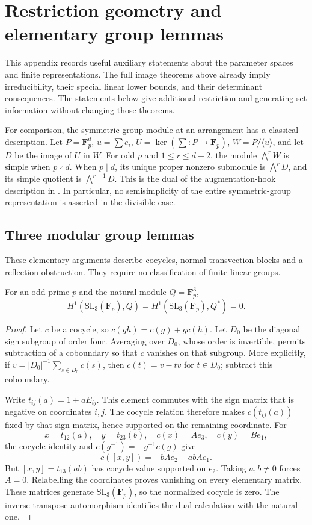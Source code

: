 \appendix
\section{Restriction geometry and elementary group lemmas}\label{app:auxiliaries}
This appendix records useful auxiliary statements about the parameter spaces and finite representations. The full image theorems above already imply irreducibility, their special linear lower bounds, and their determinant consequences. The statements below give additional restriction and generating-set information without changing those theorems.

For comparison, the symmetric-group module at an arrangement has a classical description. Let $P=\mathbf F_p^d$, $u=\sum e_i$, $U=\ker(\sum:P\to\mathbf F_p)$, $W=P/\langle u\rangle$, and let $D$ be the image of $U$ in $W$. For odd $p$ and $1\le r\le d-2$, the module $\bigwedge^rW$ is simple when $p\nmid d$. When $p\mid d$, its unique proper nonzero submodule is $\bigwedge^rD$, and its simple quotient is $\bigwedge^{r-1}D$. This is the dual of the augmentation-hook description in \citet[Theorem~2, p.~142; Propositions~1 and~4, pp.~136--138]{Peel}. In particular, no semisimplicity of the entire symmetric-group representation is asserted in the divisible case.

\subsection{Three modular group lemmas}\label{app:modular}
These elementary arguments describe cocycles, normal transvection blocks and a reflection obstruction. They require no classification of finite linear groups.

\begin{lemma}\label{lem:sl3-cocycles}
For an odd prime $p$ and the natural module $Q=\mathbf F_p^3$,
\[
H^1(\mathrm{SL}_3(\mathbf F_p),Q)
=H^1(\mathrm{SL}_3(\mathbf F_p),Q^*)=0.
\]
\end{lemma}
\begin{proof}
Let $c$ be a cocycle, so $c(gh)=c(g)+gc(h)$. Let $D_0$ be the diagonal sign subgroup of order four. Averaging over $D_0$, whose order is invertible, permits subtraction of a coboundary so that $c$ vanishes on that subgroup. More explicitly, if $v=|D_0|^{-1}\sum_{s\in D_0}c(s)$, then $c(t)=v-tv$ for $t\in D_0$; subtract this coboundary.

Write $t_{ij}(a)=1+aE_{ij}$. This element commutes with the sign matrix that is negative on coordinates $i,j$. The cocycle relation therefore makes $c(t_{ij}(a))$ fixed by that sign matrix, hence supported on the remaining coordinate. For
\[
x=t_{12}(a),\quad y=t_{23}(b),\quad
c(x)=Ae_3,\quad c(y)=Be_1,
\]
the cocycle identity and $c(g^{-1})=-g^{-1}c(g)$ give
\[
c([x,y])=-bAe_2-abAe_1.
\]
But $[x,y]=t_{13}(ab)$ has cocycle value supported on $e_2$. Taking $a,b\ne0$ forces $A=0$. Relabelling the coordinates proves vanishing on every elementary matrix. These matrices generate $\mathrm{SL}_3(\mathbf F_p)$, so the normalized cocycle is zero. The inverse-transpose automorphism identifies the dual calculation with the natural one.
\end{proof}

